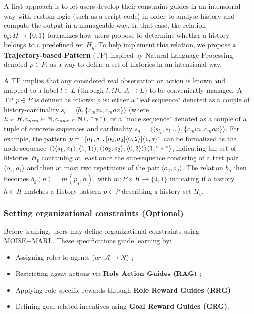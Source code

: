 \documentclass[pdflatex,sn-mathphys-num]{sn-jnl}%
\theoremstyle{thmstyleone}%
\theoremstyle{thmstyletwo}%
\theoremstyle{thmstylethree}%
\begin{document}
A first approach is to let users develop their constraint guides in an intensional way with custom logic (such as a script code) in order to analyse history and compute the output in a manageable way. In that case, the relation $b_g: H \to \{0,1\}$ formalizes how users propose to determine whether a history belongs to a predefined set $H_g$.
To help implement this relation, we propose a \textbf{Trajectory-based Pattern} (TP) inspired by Natural Language Processing, denoted $p \in P$, as a way to define a set of histories in an intensional way.

A TP implies that any considered real observation or action is known and mapped to a label $l \in L$ (through $l: \Omega \cup A \to L$) to be conveniently managed. A TP $p \in P$ is defined as follows: $p$ is: either a "leaf sequence" denoted as a couple of history-cardinality $s_l = \langle h, \{c_min,c_max\}\rangle$ (where $h \in H, c_{min} \in \mathbb{N}, c_{max} \in \mathbb{N} \cup "*")$; or a "node sequence" denoted as a couple of a tuple of concrete sequences and cardinality $s_n = \langle \langle s_{l_1}, s_{l_1}\dots \rangle, \{c_min,c_max\}\rangle$. For example, the pattern $p = \allowbreak "[o_1,a_1,[o_2,a_2]\langle0,2\rangle]\langle1,*\rangle"$ can be formalized as the node sequence $\allowbreak \langle \langle \langle o_1,a_1\rangle,\langle 1,1 \rangle \rangle, \langle \langle o_2,a_2 \rangle, \langle 0,2 \rangle \rangle \rangle \langle 1,"*" \rangle$, indicating the set of histories $H_p$ containing at least once the sub-sequence consisting of a first pair $\langle o_1,a_1\rangle$ and then at most two repetitions of the pair $\langle o_2,a_2 \rangle$.
The relation $b_g$ then becomes $b_g(h) = m(p_g,h), \text{ with } m: P \times H \to \{0,1\}$ indicating if a history $h \in H$ matches a history pattern $p \in P$ describing a history set $H_g$.

\subsubsection{Setting organizational constraints (Optional)}
Before training, users may define organizational constraints using MOISE+MARL. These specifications guide learning by:
\begin{itemize}
    \item Assigning roles to agents ($ar: \mathcal{A} \to \mathcal{R}$) ;
    \item Restricting agent actions via \textbf{Role Action Guides (RAG)} ;
    \item Applying role-specific rewards through \textbf{Role Reward Guides (RRG)} ;
    \item Defining goal-related incentives using \textbf{Goal Reward Guides (GRG)}.
\end{itemize}
\end{document}
